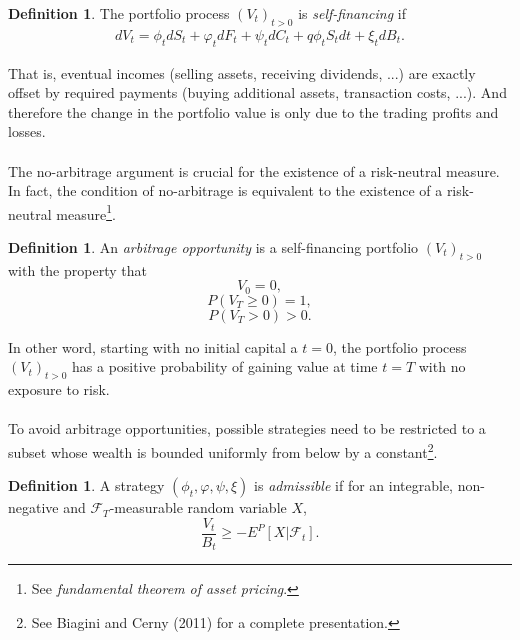 \documentclass{article}
\theoremstyle{definition}
\newtheorem{definition}[thm]{Definition}
\theoremstyle{remark}
\newcommand{\filtration}[1]{\ensuremath{\mathscr{F}_{#1}}}
\newcommand{\process}[1]{\ensuremath{(#1_t)_{t>0}}}
\begin{document}
\begin{definition}
The portfolio process \process{V} is \textit{self-financing} if
\begin{align}
dV_t=\phi_t dS_t+\varphi_t dF_t + \psi_t dC_t+q\phi_tS_tdt+\xi_t dB_t.
\end{align}
\end{definition}
That is, eventual incomes (selling assets, receiving dividends, ...) are exactly offset by required payments (buying additional assets, transaction costs, ...). And therefore the change in the portfolio value is only due to the trading profits and losses.\\
\\
The no-arbitrage argument is crucial for the existence of a risk-neutral measure. In fact, the condition of no-arbitrage is equivalent to the existence of a risk-neutral measure\footnote{See \emph{fundamental theorem of asset pricing}.}.
\begin{definition}
An \textit{arbitrage opportunity} is a self-financing portfolio \process{V} with the property that
$$V_0 = 0,$$
$$P(V_T \geq 0)=1,$$
$$P(V_T >0)>0.$$
\end{definition}
In other word, starting with no initial capital a $t=0$, the portfolio process \process{V} has a positive probability of gaining value at time $t=T$ with no exposure to risk.\\
\\
To avoid arbitrage opportunities, possible strategies need to be restricted to a subset whose wealth is bounded uniformly from below by a constant\footnote{See Biagini and Cerny (2011) for a complete presentation.}.
\begin{definition}
A strategy $(\phi_t,\varphi,\psi,\xi)$ is \textit{admissible} if for an integrable, non-negative and \filtration{T}-measurable random variable $X$, 
\begin{equation}
\frac{V_t}{B_t} \geq -E^P[X|\filtration{t}].
\end{equation}
\end{definition}







\end{document}
